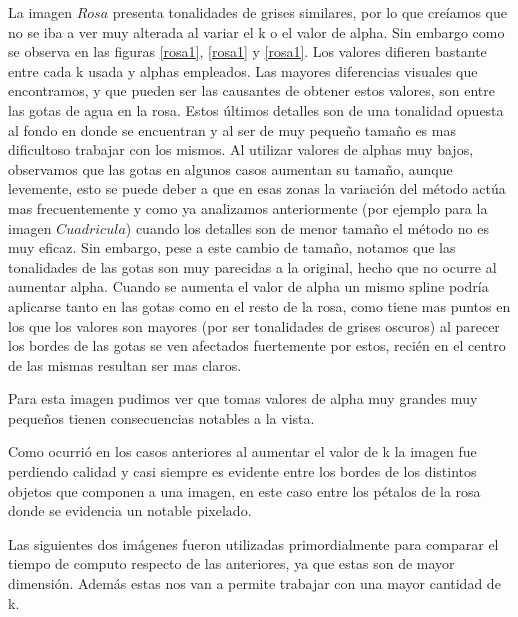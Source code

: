 \documentclass[a4paper]{article}
\begin{document}
La imagen $Rosa$ presenta tonalidades de grises similares, por lo que creíamos que no se iba a ver muy alterada al variar el k o el valor de alpha. Sin embargo como se observa en las figuras \ref{rosa1}, \ref{rosa1} y  \ref{rosa1}. Los valores difieren bastante entre cada k usada y alphas empleados. Las mayores diferencias visuales que encontramos, y que pueden ser las causantes de obtener estos valores, son entre las gotas de agua en la rosa. Estos últimos detalles son de una tonalidad opuesta al fondo en donde se encuentran y al ser de muy pequeño tamaño es mas dificultoso trabajar con los mismos. Al utilizar valores de alphas muy bajos, observamos que las gotas en algunos casos aumentan su tamaño, aunque levemente, esto se puede deber a que en esas zonas la variación del método actúa mas frecuentemente y como ya analizamos anteriormente (por ejemplo para la imagen $Cuadricula$) cuando los detalles son de menor tamaño el método no es muy eficaz. Sin embargo, pese a este cambio de tamaño, notamos que las tonalidades de las gotas son muy parecidas a la original, hecho que no ocurre al aumentar alpha. Cuando se aumenta el valor de alpha un mismo spline podría aplicarse tanto en las gotas como en el resto de la rosa, como tiene mas puntos en los que los valores son mayores (por ser tonalidades de grises oscuros) al parecer los bordes de las gotas se ven afectados fuertemente por estos, recién en el centro de las mismas  resultan ser mas claros. 

Para esta imagen pudimos ver que tomas valores de alpha muy grandes  muy pequeños tienen consecuencias notables a la vista.

Como ocurrió en los casos anteriores al aumentar el valor de k la imagen fue perdiendo calidad y casi siempre es evidente entre los bordes de los distintos objetos que componen a una imagen, en este caso entre los pétalos de la rosa donde se evidencia un notable pixelado.\newline  \newline \newline \newline \newline

Las siguientes  dos imágenes fueron utilizadas primordialmente para comparar el tiempo de computo respecto de las anteriores, ya que estas son de mayor dimensión. Además estas nos van a  permite trabajar con una mayor cantidad de k.
\end{document}
